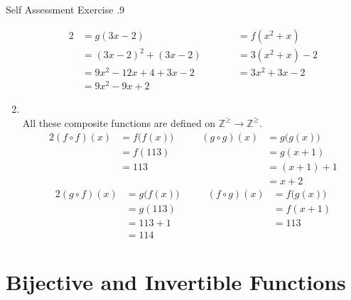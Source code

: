 \documentclass[\main/notes.tex]{subfiles}
\begin{document}
\begin{exercise}{Self Assessment Exercise \thechapter.9}
\begin{enumerate}[label=(\alph*)]
\begin{alignat*}{2}
							&= g(3x - 2) \qquad & &= f\left(x^{2} + x\right)\\
							&= (3x - 2)^{2} + (3x - 2) \qquad & &= 3\left(x^{2} + x\right) - 2\\
							&= 9x^{2} - 12x + 4 + 3x - 2 \qquad & &= 3x^{2} + 3x - 2\\
							&= 9x^{2} - 9x + 2
						\end{alignat*}
					\pagebreak
					\item {}\\
						All these composite functions are defined on $\mathbb{Z}^{\geq} \rightarrow \mathbb{Z}^{\geq}$.
						\begin{alignat*}{2}
							(f \circ f)(x) &= f\bigl(f(x)\bigr) \qquad & (g \circ g)(x) &= g\bigl(g(x)\bigr)\\
							&= f(113) \qquad & &= g(x + 1)\\
							&= 113 \qquad & &= (x + 1) + 1\\
							& \qquad & &= x + 2
						\end{alignat*}
						\begin{alignat*}{2}
							(g \circ f)(x) &= g\bigl(f(x)\bigr) \qquad & (f \circ g)(x) &= f\bigl(g(x)\bigr)\\
							&= g(113) \qquad & &= f(x + 1)\\
							&= 113 + 1 \qquad & &= 113\\
							&= 114
						\end{alignat*}
				\end{enumerate}
			\end{exercise}
		\section{Bijective and Invertible Functions}
\end{document}
